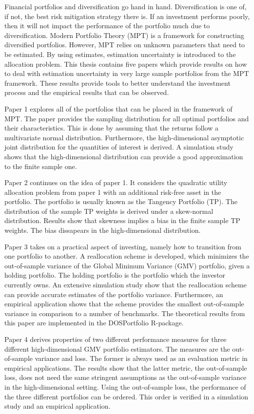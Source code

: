 Financial portfolios and diversification go hand in hand.
Diversification is one of, if not, the best risk mitigation strategy there is.
If an investment performs poorly, then it will not impact the performance of the portfolio much due to diversification.
Modern Portfolio Theory (MPT) is a framework for constructing diversified portfolios.
However, MPT relies on unknown parameters that need to be estimated.
By using estimates, estimation uncertainty is introduced to the allocation problem.
This thesis contains five papers which provide results on how to deal with estimation uncertainty in very large sample portfolios from the MPT framework.
These results provide tools to better understand the investment process and the empirical results that can be observed.

Paper 1 explores all of the portfolios that can be placed in the framework of MPT. 
The paper provides the sampling distribution for all optimal portfolios and their characteristics.
This is done by assuming that the returns follow a multivariate normal distribution.
Furthermore, the high-dimensional asymptotic joint distribution for the quantities of interest is derived.
A simulation study shows that the high-dimensional distribution can provide a good approximation to the finite sample one.

Paper 2 continues on the idea of paper 1.
It considers the quadratic utility allocation problem from paper 1 with an additional risk-free asset in the portfolio.
The portfolio is usually known as the Tangency Portfolio (TP).
The distribution of the sample TP weights is derived under a skew-normal distribution.
Results show that skewness implies a bias in the finite sample TP weights.
The bias dissapears in the high-dimensional distribution.

Paper 3 takes on a practical aspect of investing, namely how to transition from one portfolio to another.
A reallocation scheme is developed, which minimizes the out-of-sample variance of the Global Minimum Variance (GMV) portfolio, given a holding portfolio. 
The holding portfolio is the portfolio which the investor currently owns.
An extensive simulation study show that the reallocation scheme can provide accurate estimates of the portfolio variance.
Furthermore, an empirical application shows that the scheme provides the smallest out-of-sample variance in comparison to a number of benchmarks.
The theoretical results from this paper are implemented in the DOSPortfolio R-package.

Paper 4 derives properties of two different performance measures for three different high-dimensional GMV portfolio estimators. 
The measures are the out-of-sample variance and loss.
The former is always used as an evaluation metric in empirical applications.
The results show that the latter metric, the out-of-sample loss, does not need the same stringent assumptions as the out-of-sample variance in the high-dimensional setting.
Using the out-of-sample loss, the performance of the three different portfolios can be ordered.
This order is verified in a simulation study and an empirical application.

